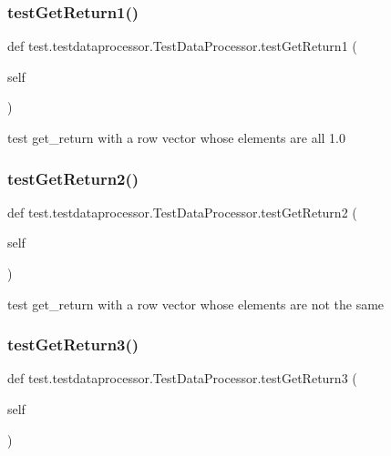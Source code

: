 \subsubsection{\texorpdfstring{test\+Get\+Return1()}{testGetReturn1()}}
{\footnotesize\ttfamily def test.\+testdataprocessor.\+Test\+Data\+Processor.\+test\+Get\+Return1 (\begin{DoxyParamCaption}\item[{}]{self }\end{DoxyParamCaption})}

\begin{DoxyVerb}test get_return with a row vector whose elements are all 1.0\end{DoxyVerb}
 \mbox{\label{classtest_1_1testdataprocessor_1_1TestDataProcessor_aa0451dcab76c90b2824fbc91c3f4bee0}} 
\subsubsection{\texorpdfstring{test\+Get\+Return2()}{testGetReturn2()}}
{\footnotesize\ttfamily def test.\+testdataprocessor.\+Test\+Data\+Processor.\+test\+Get\+Return2 (\begin{DoxyParamCaption}\item[{}]{self }\end{DoxyParamCaption})}

\begin{DoxyVerb}test get_return with a row vector whose elements are not the same\end{DoxyVerb}
 \mbox{\label{classtest_1_1testdataprocessor_1_1TestDataProcessor_a6e171daffdd0608e5334d54795c20626}} 
\subsubsection{\texorpdfstring{test\+Get\+Return3()}{testGetReturn3()}}
{\footnotesize\ttfamily def test.\+testdataprocessor.\+Test\+Data\+Processor.\+test\+Get\+Return3 (\begin{DoxyParamCaption}\item[{}]{self }\end{DoxyParamCaption})}

